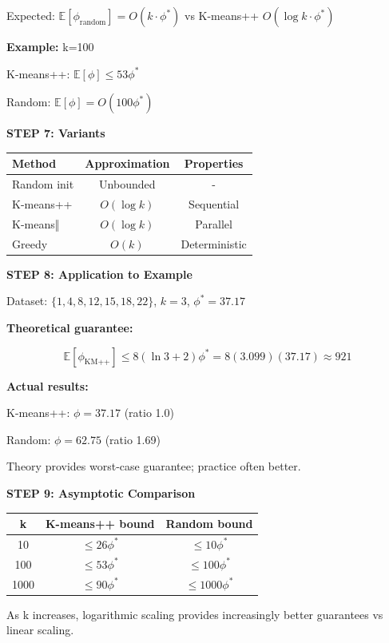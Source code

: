 \documentclass[12pt]{article}
\begin{document}
\begin{solution}
Expected: $\mathbb{E}[\phi_{\text{random}}] = O(k \cdot \phi^*)$ vs K-means++ $O(\log k \cdot \phi^*)$

\textbf{Example:} k=100

K-means++: $\mathbb{E}[\phi] \leq 53\phi^*$

Random: $\mathbb{E}[\phi] = O(100\phi^*)$

\textbf{STEP 7: Variants}

\begin{center}
\begin{tabular}{l|c|c}
\textbf{Method} & \textbf{Approximation} & \textbf{Properties} \\
\hline
Random init & Unbounded & - \\
K-means++ & $O(\log k)$ & Sequential \\
K-means‖ & $O(\log k)$ & Parallel \\
Greedy & $O(k)$ & Deterministic \\
\end{tabular}
\end{center}

\textbf{STEP 8: Application to Example}

Dataset: $\{1, 4, 8, 12, 15, 18, 22\}$, $k=3$, $\phi^* = 37.17$

\textbf{Theoretical guarantee:}

\[
\mathbb{E}[\phi_{\text{KM++}}] \leq 8(\ln 3 + 2) \phi^* = 8(3.099)(37.17) \approx 921
\]

\textbf{Actual results:}

K-means++: $\phi = 37.17$ (ratio 1.0)

Random: $\phi = 62.75$ (ratio 1.69)

Theory provides worst-case guarantee; practice often better.

\textbf{STEP 9: Asymptotic Comparison}

\begin{center}
\begin{tabular}{c|c|c}
k & K-means++ bound & Random bound \\
\hline
10 & $\leq 26\phi^*$ & $\leq 10\phi^*$ \\
100 & $\leq 53\phi^*$ & $\leq 100\phi^*$ \\
1000 & $\leq 90\phi^*$ & $\leq 1000\phi^*$ \\
\end{tabular}
\end{center}

As k increases, logarithmic scaling provides increasingly better guarantees vs linear scaling.

\end{solution}
\end{document}
